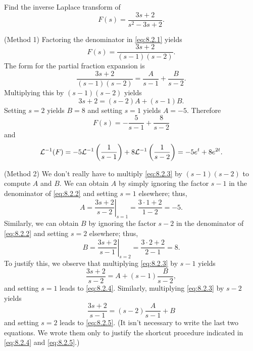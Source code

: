 \setcounter{example}{3}
\setcounter{equation}{0}
\begin{example}
  \label{example:8.2.4}\rm Find the inverse Laplace transform of
  \begin{equation}
    \label{eq:8.2.1}F(s)=\frac{3s+2}{s^{2}-3s+2}.
  \end{equation}
\end{example}
\setcounter{equation}{1}
\begin{examplesolution}
\solution ({\sc Method 1}) Factoring the denominator in \eqref{eq:8.2.1} yields
\begin{equation}
  \label{eq:8.2.2}F(s)=\frac{3s+2}{(s-1)(s-2)}.
\end{equation}
The form for the partial fraction expansion is
\begin{equation}
  \label{eq:8.2.3}\frac{3s+2}{(s-1)(s-2)}=\frac{A}{s-1}+\frac{B}{s-2}.
\end{equation}
Multiplying this by $(s-1)(s-2)$ yields
\[
  3s+2=(s-2)A+(s-1)B.
\]
Setting $s=2$ yields $B=8$ and setting $s=1$ yields $A=-5$. Therefore
\[
  F(s)=-\frac{5}{s-1}+\frac{8}{s-2}
\]
and
\[
  {\cal L}^{-1}(F)=-5{\cal L}^{-1}\left(\frac{1}{s-1}\right) +8{\cal L}^{-1}\left(\frac{1}{s-2}\right)=-5e^{t}+8e^{2t}.
\]

\solution ({\sc Method 2}) We don't really have to multiply \eqref{eq:8.2.3} by $(s-1)(s-2)$ to
compute $A$ and $B$. We can obtain $A$ by simply ignoring the factor $s-1$ in the denominator of
\eqref{eq:8.2.2} and setting $s=1$ elsewhere; thus,
\begin{equation}
  \label{eq:8.2.4}A=\left.\frac{3s+2}{s-2}\right|_{s=1}=\frac{3\cdot1+2}{1-2}=-5.
\end{equation}
Similarly, we can obtain $B$ by ignoring the factor $s-2$ in the denominator of \eqref{eq:8.2.2} and
setting $s=2$ elsewhere; thus,
\begin{equation}
  \label{eq:8.2.5}B=\left.\frac{3s+2}{s-1}\right|_{s=2}=\frac{3\cdot2+2}{2-1}=8.
\end{equation}
To justify this, we observe that multiplying \eqref{eq:8.2.3} by $s-1$ yields
\[
  \frac{3s+2}{s-2}=A+(s-1)\frac{B}{s-2},
\]
and setting $s=1$ leads to \eqref{eq:8.2.4}. Similarly, multiplying \eqref{eq:8.2.3} by $s-2$ yields
\[
  \frac{3s+2}{s-1}=(s-2)\frac{A}{s-1}+B
\]
and setting $s=2$ leads to \eqref{eq:8.2.5}. (It isn't necessary to write the last two equations. We
wrote them only to justify the shortcut procedure indicated in \eqref{eq:8.2.4} and
\eqref{eq:8.2.5}.) \bbox
\end{examplesolution}

